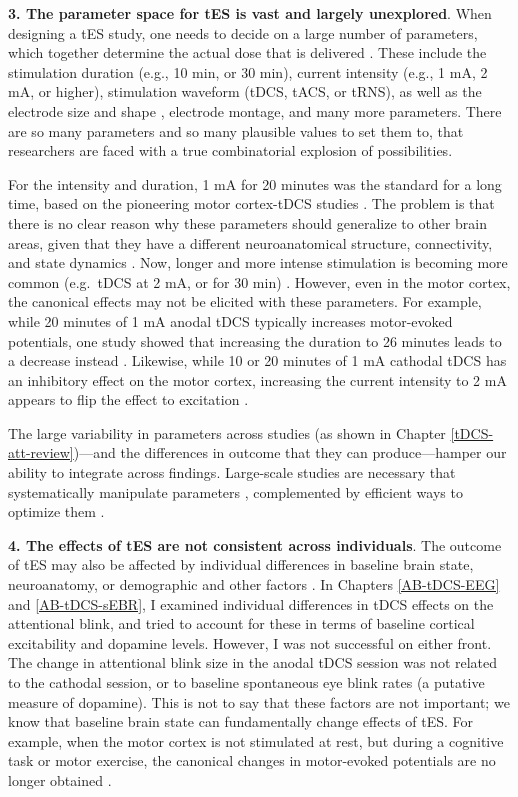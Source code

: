 \documentclass[11pt,english,]{memoir}
\begin{document}
\textbf{3. The parameter space for tES is vast and largely unexplored}. When designing a tES study, one needs to decide on a large number of parameters, which together determine the actual dose that is delivered \autocite{Peterchev2012}. These include the stimulation duration (e.g., 10 min, or 30 min), current intensity (e.g., 1 mA, 2 mA, or higher), stimulation waveform (tDCS, tACS, or tRNS), as well as the electrode size and shape \autocite{Saturnino2015}, electrode montage, and many more parameters. There are so many parameters and so many plausible values to set them to, that researchers are faced with a true combinatorial explosion of possibilities.

For the intensity and duration, 1 mA for 20 minutes was the standard for a long time, based on the pioneering motor cortex-tDCS studies \autocites{Nitsche2000}{Nitsche2001}. The problem is that there is no clear reason why these parameters should generalize to other brain areas, given that they have a different neuroanatomical structure, connectivity, and state dynamics \autocite{Bestmann2017}. Now, longer and more intense stimulation is becoming more common (e.g.~tDCS at 2 mA, or for 30 min) \autocites{Bikson2016}{Grossman2018}. However, even in the motor cortex, the canonical effects may not be elicited with these parameters. For example, while 20 minutes of 1 mA anodal tDCS typically increases motor-evoked potentials, one study showed that increasing the duration to 26 minutes leads to a decrease instead \autocite{Monte-Silva2013}. Likewise, while 10 or 20 minutes of 1 mA cathodal tDCS has an inhibitory effect on the motor cortex, increasing the current intensity to 2 mA appears to flip the effect to excitation \autocites{Batsikadze2013}{Parkin2018}{Samani2019}.

The large variability in parameters across studies (as shown in Chapter \ref{tDCS-att-review})---and the differences in outcome that they can produce---hamper our ability to integrate across findings. Large-scale studies are necessary that systematically manipulate parameters \autocite[e.g.][]{Samani2019}, complemented by efficient ways to optimize them \autocite[e.g.][]{Violante2019}.

\textbf{4. The effects of tES are not consistent across individuals}. The outcome of tES may also be affected by individual differences in baseline brain state, neuroanatomy, or demographic and other factors \autocite{Polania2018}. In Chapters \ref{AB-tDCS-EEG} and \ref{AB-tDCS-sEBR}, I examined individual differences in tDCS effects on the attentional blink, and tried to account for these in terms of baseline cortical excitability and dopamine levels. However, I was not successful on either front. The change in attentional blink size in the anodal tDCS session was not related to the cathodal session, or to baseline spontaneous eye blink rates (a putative measure of dopamine). This is not to say that these factors are not important; we know that baseline brain state can fundamentally change effects of tES. For example, when the motor cortex is not stimulated at rest, but during a cognitive task or motor exercise, the canonical changes in motor-evoked potentials are no longer obtained \autocite{Antal2007}.
\end{document}
